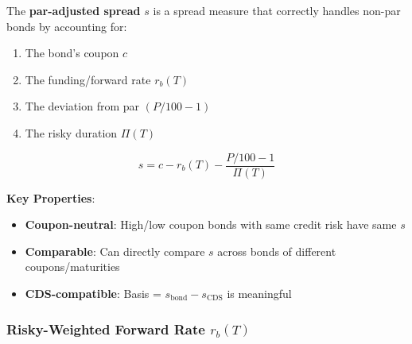 \documentclass[11pt,a4paper]{article}
\begin{document}
\begin{keybox}
The \textbf{par-adjusted spread} $s$ is a spread measure that correctly handles non-par bonds by accounting for:
\begin{enumerate}
    \item The bond's coupon $c$
    \item The funding/forward rate $r_b(T)$
    \item The deviation from par $(P/100 - 1)$
    \item The risky duration $\Pi(T)$
\end{enumerate}

\begin{equation}
\boxed{s = c - r_b(T) - \frac{P/100 - 1}{\Pi(T)}}
\end{equation}

\textbf{Key Properties}:
\begin{itemize}
    \item \textbf{Coupon-neutral}: High/low coupon bonds with same credit risk have same $s$
    \item \textbf{Comparable}: Can directly compare $s$ across bonds of different coupons/maturities
    \item \textbf{CDS-compatible}: Basis = $s_{\text{bond}} - s_{\text{CDS}}$ is meaningful
\end{itemize}
\end{keybox}

\subsubsection{Risky-Weighted Forward Rate $r_b(T)$}
\end{document}

